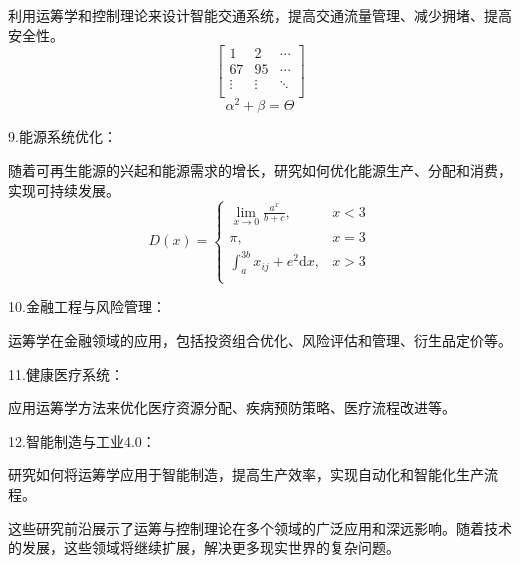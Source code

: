 利用运筹学和控制理论来设计智能交通系统，提高交通流量管理、减少拥堵、提高安全性。
$$\begin{bmatrix}
1 & 2 & \cdots \\
67 & 95 & \cdots \\
\vdots  & \vdots & \ddots \\
\end{bmatrix}$$
$$ \alpha^{2} + \beta = \Theta  $$

9.能源系统优化：

随着可再生能源的兴起和能源需求的增长，研究如何优化能源生产、分配和消费，实现可持续发展。
$$D(x) = \begin{cases}
\lim\limits_{x \to 0} \frac{a^x}{b+c}, & x<3 \\
\pi, & x=3 \\
\int_a^{3b}x_{ij}+e^2 \mathrm{d}x,& x>3 \\
\end{cases}$$

10.金融工程与风险管理：

运筹学在金融领域的应用，包括投资组合优化、风险评估和管理、衍生品定价等。

11.健康医疗系统：

应用运筹学方法来优化医疗资源分配、疾病预防策略、医疗流程改进等。

12.智能制造与工业4.0：

研究如何将运筹学应用于智能制造，提高生产效率，实现自动化和智能化生产流程。

这些研究前沿展示了运筹与控制理论在多个领域的广泛应用和深远影响。随着技术的发展，这些领域将继续扩展，解决更多现实世界的复杂问题。
